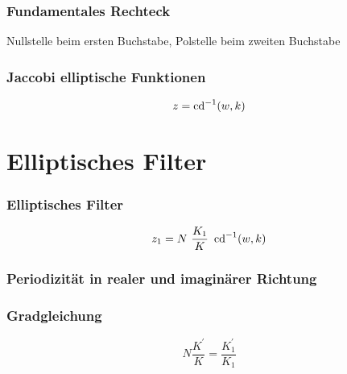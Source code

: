 \documentclass[ngerman, aspectratio=169, xcolor={rgb}]{beamer}
\begin{document}
	\begin{frame}
		\frametitle{Fundamentales Rechteck}

		Nullstelle beim ersten Buchstabe, Polstelle beim zweiten Buchstabe

		\begin{center}
			\scalebox{0.8}{
				
			}
		\end{center}

	\end{frame}


	\begin{frame}
		\frametitle{Jaccobi elliptische Funktionen}

		\begin{equation*}
			z = \cd^{-1}(w, k)
		\end{equation*}

		\begin{center}
			\scalebox{0.7}{
				

			}
		\end{center}

	\end{frame}

	\section{Elliptisches Filter}

	\begin{frame}
		\frametitle{Elliptisches Filter}

		\begin{equation*}
			z_1 = N~\frac{K_1}{K}~\cd^{-1}(w, k)
		\end{equation*}

		\begin{center}
			\scalebox{0.75}{
				
			}
		\end{center}

	\end{frame}

	\begin{frame}
		\frametitle{Periodizität in realer und imaginärer Richtung}

		\begin{center}
			
		\end{center}


	\end{frame}

	\begin{frame}
		\frametitle{Gradgleichung}

		\begin{equation}
			N \frac{K^\prime}{K} = \frac{K^\prime_1}{K_1}
		\end{equation}

		\begin{center}
			\scalebox{0.95}{
				
			}
		\end{center}


	\end{frame}
\end{document}
